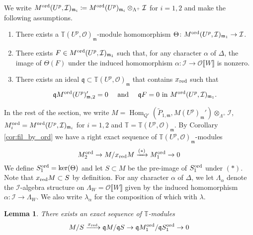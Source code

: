 \documentclass[leqno]{amsart}
\newtheorem{lem}[thm]{Lemma}
\theoremstyle{definition}
\theoremstyle{remark}
\newcommand{\oo}{\mathcal{O}}
\DeclareMathOperator{\Hom}{Hom}
\newcommand{\fm}{\mathfrak{m}}
\newcommand{\fq}{\mathfrak{q}}
\newcommand{\xx}{x_\textnormal{red}}
\newcommand{\TT}{\mathbb{T}} %
\newcommand{\I}{\mathcal{I}} %
\newcommand{\ord}{\textnormal{ord}} %
\begin{document}
We write
$M^{\ord}(U^p,\I)_{\fm_i}\coloneqq
M^{\ord}(U^p)_{\fm_i}\otimes_{\Lambda^+}\I$ for $i=1,2$
and make the following assumptions.
\begin{enumerate}[label=(C\arabic*)]
\item There exists a $\TT(U^p,\oo)_\fm$-module 
homomorphism
$\Theta\colon M^{\ord}(U^p,\I)_{\fm_1}\to \I$.
\label{cond:C1}
\item There exists $F\in M^{\ord}(U^p,\I)_{\fm_1}$
such that,
for any character $\alpha$ of $\Delta$,
the image of $\Theta(F)$ under the induced homomorphism
$\alpha\colon\I\to\oo\llbracket W\rrbracket$ is nonzero.
\label{cond:C3}
\item There exists an ideal 
$\fq\subset \TT(U^p,\oo)_{\fm}$
that contains $\xx$ such that
\[
    \fq M^{\ord}(U^p)_{\fm,2}'=0\quad
    \text{ and }\quad
    \fq F=0 \text{ in } M^{\ord}(U^p,\I)_{\fm_1}.
\]
\label{cond:C2}

\end{enumerate}

In the rest of the section, we write
$M=\Hom_{Q'}(\tilde{P}_{1,\fm},M(U^p)_{\fm}')
\otimes_{\Lambda^+}\I$,
$M_i^{\ord}=M^{\ord}(U^p,\I)_{\fm_i}$ for $i=1,2$ and
$\TT=\TT(U^p,\oo)_{\fm}$.
By Corollary \ref{cor:fil_by_ord}
we have a right exact sequence of $\TT(U^p,\oo)_\fm$-modules
\begin{equation}\label{eq:chain_coh}
    M_2^{\ord}\to M/\xx M\xrightarrow{(*)} M_1^{\ord}\to 0
\end{equation}
We define $S_1^{\ord}=\ker(\Theta)$ and let $S\subset M$
be the pre-image of $S_1^{\ord}$ under $(*)$.
Note that $\xx M\subset S$ by definition.
For any character $\alpha$ of $\Delta$,
we let $\Lambda_\alpha$ denote the $\I$-algebra structure
on $\Lambda_W=\oo\llbracket W\rrbracket$ given by 
the induced homomorphism $\alpha\colon\I\to \Lambda_W$.
We also write $\lambda_\alpha$
for the composition of which with $\lambda$.


\begin{lem}\label{lem:right_exact}
There exists an exact sequence
of $\TT$-modules
\begin{equation}\label{eq:fund}
	M/S\xrightarrow{\xx} \fq M/\fq S\to 
	\fq M_1^\ord/\fq S_1^\ord \to 0
\end{equation}
\end{lem}
\end{document}
